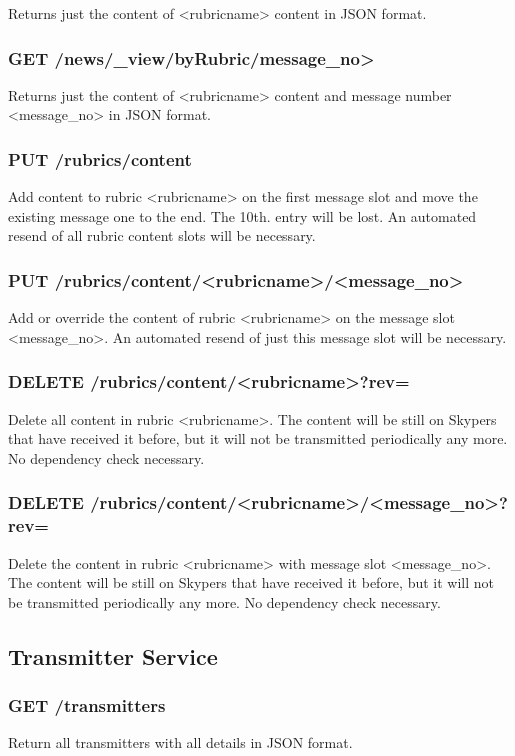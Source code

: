 Returns just the content of <rubricname> content in JSON format.

\subsubsection{GET /news/\_view/byRubric/message\_no>}
Returns just the content of <rubricname> content and message number <message\_no> in JSON format.

\subsubsection{PUT /rubrics/content}
Add content to rubric <rubricname> on the first message slot and move the existing message one to the end. The 10th. entry will be lost. An automated resend of all rubric content slots will be necessary.

\subsubsection{PUT /rubrics/content/<rubricname>/<message\_no>}
Add or override the content of rubric <rubricname> on the message slot <message\_no>. An automated resend of just this message slot will be necessary.

\subsubsection{DELETE /rubrics/content/<rubricname>?rev=}
Delete all content in rubric <rubricname>. The content will be still on Skypers that have received it before, but it will not be transmitted periodically any more. No dependency check necessary.

\subsubsection{DELETE /rubrics/content/<rubricname>/<message\_no>?rev=}
Delete the content in rubric <rubricname> with message slot <message\_no>. The content will be still on Skypers that have received it before, but it will not be transmitted periodically any more. No dependency check necessary.

\subsection{Transmitter Service}

\subsubsection{GET /transmitters}
Return all transmitters with all details in JSON format.


